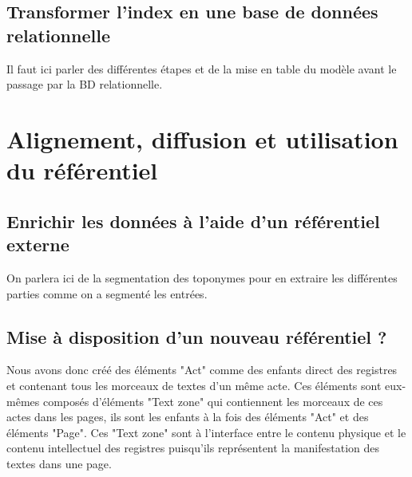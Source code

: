 \documentclass[a4paper,12pt,twoside]{book}
\begin{document}
	\chapter{Transformer l’index en une base de données relationnelle}
	
	Il faut ici parler des différentes étapes et de la mise en table du modèle avant le passage par la BD relationnelle.
	
	\part{Alignement, diffusion et utilisation du référentiel}
	
	\chapter{Enrichir les données à l’aide d’un référentiel externe}
	
	On parlera ici de la segmentation des toponymes pour en extraire les différentes parties comme on a segmenté les entrées.
	
	\chapter{Mise à disposition d'un nouveau référentiel ?}
	
		Nous avons donc créé des éléments "Act" comme des enfants direct des registres et contenant tous les morceaux de textes d'un même acte. Ces éléments sont eux-mêmes composés d'éléments "Text zone" qui contiennent les morceaux de ces actes dans les pages, ils sont les enfants à la fois des éléments "Act" et des éléments "Page". Ces "Text zone" sont à l'interface entre le contenu physique et le contenu intellectuel des registres puisqu'ils représentent la manifestation des textes dans une page.
	
\end{document}
